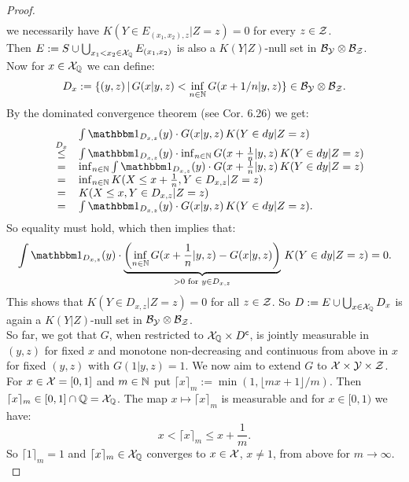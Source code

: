 \begin{Thm}
\begin{proof}
\[\begin{array}{rcl}
\end{array}\]
we necessarily have $ K(Y \in E_{(x_1,x_2),z} |Z=z) = 0$ for every $z \in \mathcal{Z}$.\\
Then $E:= S \cup  \bigcup_{x_1 < x_2 \in \mathcal{X}_{\mathbb{Q}}} E_{(x_1,x_2)}$ is also a $ K(Y|Z)$-null set in $\mathcal{B}_{\mathcal{Y}} \otimes \mathcal{B}_{\mathcal{Z}}$.\\
Now for $x \in \mathcal{X}_{\mathbb{Q}}$ we can define: 
\[ D_x := \{ (y,z) \,|\, G(x|y,z) <  \inf_{n \in \mathbb{N}} G(x+1/n|y,z)  \} \in \mathcal{B}_{\mathcal{Y}} \otimes \mathcal{B}_{\mathcal{Z}}.\]
By the dominated convergence theorem (see \cite{Kle20}  Cor. 6.26) we get:
\[ \begin{array}{rcl}
&&  \int \I_{D_{x,z}}(y) \cdot G(x|y,z) \,  K(Y \in dy|Z=z) \\
&\stackrel{D_x}{\le}& \int \I_{D_{x,z}}(y) \cdot \inf_{n \in \N} G(x+\frac{1}{n}|y,z) \,  K(Y \in dy|Z=z) \\
&=& \inf_{n \in \N} \int \I_{D_{x,z}}(y) \cdot G(x+\frac{1}{n}|y,z) \,  K(Y \in dy|Z=z) \\
&=& \inf_{n \in \N}  K(X \le x + \frac{1}{n}, Y \in D_{x,z} |Z=z) \\
&=&   K(X \le x, Y \in D_{x,z} |Z=z) \\
&=& \int \I_{D_{x,z}}(y) \cdot G(x|y,z) \,  K(Y \in dy|Z=z).
\end{array}\]
So equality must hold, which then implies that:
\[
    \int \I_{D_{x,z}}(y) \cdot \underbrace{\lp \inf_{n \in \N} G(x+\frac{1}{n}|y,z) - G(x|y,z) \rp}_{> 0 \text{ for } y \in D_{x,z}} \,  K(Y \in dy|Z=z) =0.
\]
This shows that $ K(Y \in D_{x,z}|Z=z)=0$ for all $z \in \mathcal{Z}$.
So $D:= E \cup \bigcup_{x \in \mathcal{X}_{\mathbb{Q}}} D_x$ is again a $ K(Y|Z)$-null set in $\mathcal{B}_{\mathcal{Y}} \otimes \mathcal{B}_{\mathcal{Z}}$.\\
So far, we got that $G$, when restricted to $\mathcal{X}_{\mathbb{Q}} \times D^{\mathsf{c}}$,
is jointly measurable in $(y,z)$ for fixed $x$ and monotone non-decreasing and continuous from above in $x$ for fixed $(y,z)$ with $G(1|y,z)=1$.
We now aim to extend $G$ to $\mathcal{X} \times \mathcal{Y} \times \mathcal{Z}$.\\
For  $x \in \mathcal{X} =[0,1]$ and $m \in \mathbb{N}$ put $\lceil x\rceil_m:=\min(1,\lfloor mx+1\rfloor/m)$. 
Then $\lceil x\rceil_m \in [0,1] \cap \mathbb{Q} = \mathcal{X}_{\mathbb{Q}}$. 
The map $x \mapsto \lceil x\rceil_m$ is measurable and for $x \in [0,1)$ we have: 
\[ x < \lceil x\rceil_m \le x + \frac{1}{m}.\]
So $\lceil 1\rceil_m=1$ and  $\lceil x\rceil_m \in \mathcal{X}_{\mathbb{Q}}$ converges to $x \in \mathcal{X}$, $x \neq 1$, from above for $m \to \infty$.\\

\end{proof}
\end{Thm}
